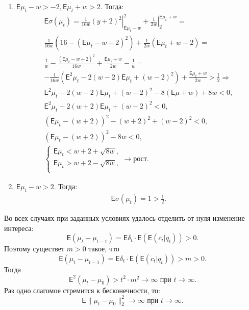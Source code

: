 \documentclass[12pt, twoside]{article}
\begin{document}
\begin{enumerate}
  \item $\mathsf{E}\mu_t - w > -2, \mathsf{E}\mu_t + w > 2$. Тогда: 
    \begin{gather*}
      \mathsf{E}\sigma(\mu_t) = \left. \frac{1}{16 w} (y+2)^2 \right|_{\mathsf{E}\mu_t-w}^{2} + \left. \frac{1}{2w}\right|_{2}^{\mathsf{E}\mu_t + w} = \\ 
          \frac{1}{16 w} \left( 16 - (\mathsf{E} \mu_t-w+2)^2 \right) + \frac{1}{2 w}(\mathsf{E}\mu_t + w -2) = \\
          \frac{1}{w} - \frac{(\mathsf{E}\mu_t-w+2)^2}{16w} + \frac{\mathsf{E}\mu_t+w}{2w} - \frac{1}{w} = \\
          -\frac{1}{16w} (\mathsf{E}^2\mu_t - 2(w-2)\mathsf{E}\mu_t + (w-2)^2) + \frac{\mathsf{E}\mu_t + w}{2 w} > \frac{1}{2} \Rightarrow \\
          \mathsf{E}^2\mu_t - 2(w-2)\mathsf{E}\mu_t + (w-2)^2 - 8(\mathsf{E}\mu + w) + 8w < 0, \\
          \mathsf{E}^2\mu_t - 2(w+2)\mathsf{E}\mu_t + (w-2)^2 < 0, \\
          \left(\mathsf{E}\mu_t - (w+2) \right)^2 - (w+2)^2 + (w-2)^2 < 0, \\
          (\mathsf{E}\mu_t - (w+2))^2 - 8w < 0, \\
    \begin{cases}
      \mathsf{E}\mu_t < w + 2 + \sqrt{8w}, \\
      \mathsf{E}\mu_t > w + 2 - \sqrt{8w}, \\
    \end{cases} \to \text{рост}.
    \end{gather*}
  
  \item $\mathsf{E}\mu_t - w > 2$. Тогда: 
    \begin{gather*}
      \mathsf{E}\sigma(\mu_t) = 1 > \frac{1}{2}.
    \end{gather*}
\end{enumerate}

Во всех случаях при заданных условиях удалось отделить от нуля изменение интереса: 
\[
  \mathsf{E}(\mu_{t} - \mu_{t-1}) = \mathsf{E}\delta_t \cdot \mathsf{E}(\mathsf{E}(c_t|q_t)) > 0.
\]
Поэтому существет $m > 0$ такое, что 
\[
  \mathsf{E}(\mu_{t} - \mu_{t-1}) = \mathsf{E}\delta_t \cdot \mathsf{E}(\mathsf{E}(c_t|q_t)) > m > 0.
\]
Тогда 
\[\mathsf{E}^2(\mu_{t} - \mu_{0}) > t^2 \cdot m^2 \to \infty \text{ при } t \to \infty.\]
Раз одно слагомое стремится к бесконечности, то:
\[\mathsf{E}\|\mu_t - \mu_0 \|^2_2 \to \infty \text{ при } t \to \infty.\]

\end{document}
